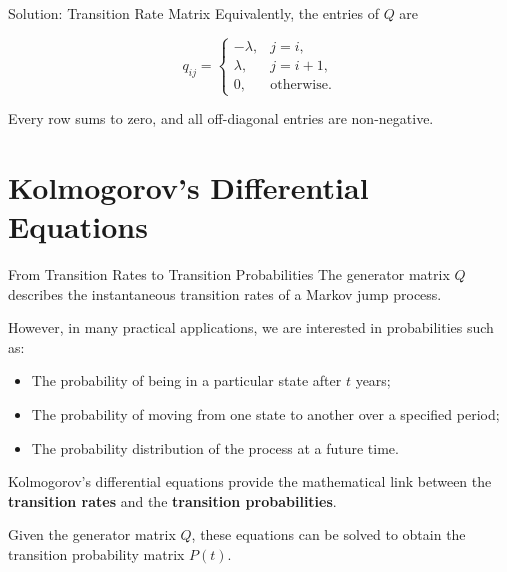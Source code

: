 \documentclass[
  ignorenonframetext,
  aspectratio=169,
]{beamer}
\providecommand{\tightlist}{%
  \setlength{\itemsep}{0pt}\setlength{\parskip}{0pt}}
\begin{document}
\begin{frame}{Solution: Transition Rate Matrix}
\protect{}\label{solution-transition-rate-matrix-3}
Equivalently, the entries of \(Q\) are

\[
q_{ij}=
\begin{cases}
-\lambda, & j=i,\\
\lambda, & j=i+1,\\
0, & \text{otherwise}.
\end{cases}
\]

Every row sums to zero, and all off-diagonal entries are non-negative.
\end{frame}

\section{Kolmogorov's Differential
Equations}\label{kolmogorovs-differential-equations}

\begin{frame}{From Transition Rates to Transition Probabilities}
\protect{}\label{from-transition-rates-to-transition-probabilities}
The generator matrix \(Q\) describes the instantaneous transition rates
of a Markov jump process.

However, in many practical applications, we are interested in
probabilities such as:

\begin{itemize}
\tightlist
\item
  The probability of being in a particular state after \(t\) years;
\item
  The probability of moving from one state to another over a specified
  period;
\item
  The probability distribution of the process at a future time.
\end{itemize}

Kolmogorov's differential equations provide the mathematical link
between the \textbf{transition rates} and the \textbf{transition
probabilities}.

Given the generator matrix \(Q\), these equations can be solved to
obtain the transition probability matrix \(P(t)\).
\end{frame}
\end{document}

